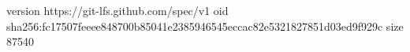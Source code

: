 version https://git-lfs.github.com/spec/v1
oid sha256:fc17507feeee848700b85041e2385946545eccac82e5321827851d03ed9f929c
size 87540
